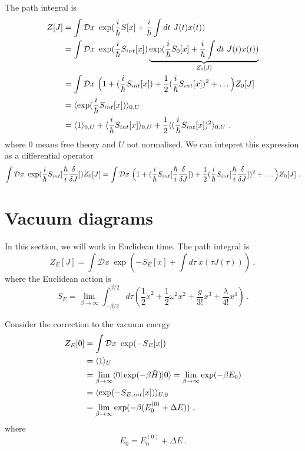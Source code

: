     The path integral is 
    \begin{equation*}
    \begin{aligned}
        Z[J] & = \int \mathcal D x ~ \exp(\frac{i}{\hbar} S[x] + \frac{i}{\hbar} \int dt ~ J(t) x(t)) \\ & = \int \mathcal D x ~ \exp(\frac{i}{\hbar} S_{int}[x]) \underbrace{\exp(\frac{i}{\hbar} S_0[x] + \frac{i}{\hbar} \int dt ~ J(t) x(t))}_{Z_0[J]} \\ & = \int \mathcal D x ~ \Big ( 1 + (\frac{i}{\hbar} S_{int}[x]) + \frac{1}{2} (\frac{i}{\hbar} S_{int}[x])^2 + \ldots \Big ) Z_0[J] \\ & = \langle\exp(\frac{i}{\hbar} S_{int}[x])\rangle_{0, U} \\ & = \langle1\rangle_{0, U} + \langle\frac{i}{\hbar} S_{int}[x]\rangle_{0, U} + \frac{1}{2} \langle(\frac{i}{\hbar} S_{int}[x])^2\rangle_{0, U} ~.
    \end{aligned}
    \end{equation*}
    where $0$ means free theory and $U$ not normalised. We can intepret this expression as a differential operator
    \begin{equation*}
        \int \mathcal D x ~ \exp(\frac{i}{\hbar} S_{int}[\frac{\hbar}{i} \frac{\delta }{\delta J}]) Z_0[J] = \int \mathcal D x ~ \Big ( 1 + (\frac{i}{\hbar} S_{int}[\frac{\hbar}{i} \frac{\delta }{\delta J}]) + \frac{1}{2} (\frac{i}{\hbar} S_{int}[\frac{\hbar}{i} \frac{\delta }{\delta J}])^2 + \ldots \Big ) Z_0[J] ~.
    \end{equation*}

\section{Vacuum diagrams}

    In this section, we will work in Euclidean time. The path integral is
    \begin{equation*}
        Z_E[J] = \int \mathcal D x ~ \exp(-S_E[x] + \int d\tau ~ x(\tau J(\tau))) ~,
    \end{equation*}
    where the Euclidean action is 
    \begin{equation*}
        S_E = \lim_{\beta \rightarrow \infty} \int_{-\beta/2}^{\beta/2} d\tau (\frac{1}{2} \dot x^2 + \frac{1}{2} \omega^2 x^2 + \frac{g}{3!} x^3 + \frac{\lambda}{4!} x^4) ~.
    \end{equation*}

    Consider the correction to the vacuum energy 
    \begin{equation*}
    \begin{aligned}
        Z_E[0] & = \int \mathcal D x ~ \exp(- S_E[x]) \\ & = \langle1\rangle_U \\ & = \lim_{\beta \rightarrow \infty} \langle0\vert \exp(- \beta \hat H) \vert0\rangle = \lim_{\beta \rightarrow \infty} \exp(- \beta E_0) \\ & = \langle\exp(- S_{E, int} [x])\rangle _{U, 0} \\ & = \lim_{\beta \rightarrow \infty} \exp(- \beta (E_0^{(0)} + \Delta E)) ~,
    \end{aligned}
    \end{equation*}
    where 
    \begin{equation*}
        E_0 = E_0^{(0)} + \Delta E ~.
    \end{equation*}

